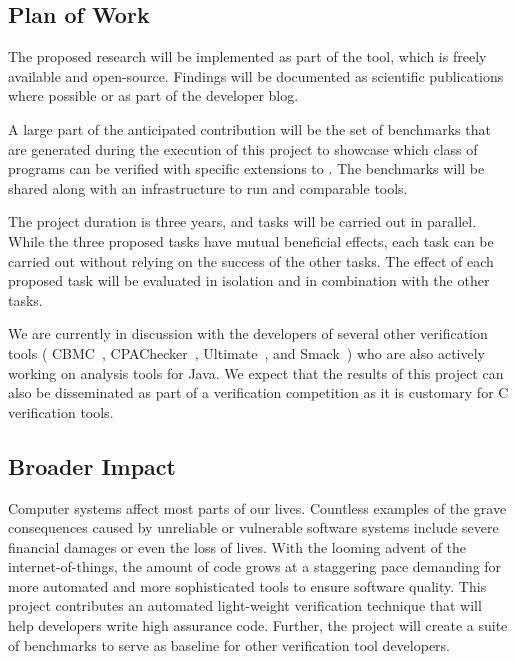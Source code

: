 \subsection{Plan of Work} %
\label{sec-impl}
The proposed research will be implemented as part of the \jayhorn tool,
which is freely available and open-source. Findings will be documented
as scientific publications where possible or as part of the \jayhorn
developer blog. 

A large part of the anticipated contribution will be the set of
benchmarks that are generated during the execution of this project to 
showcase which class of programs can be verified with specific extensions
to \jayhorn. The benchmarks will be shared along with an infrastructure
to run \jayhorn and comparable tools.

The project duration is three years, and tasks will be carried out in parallel.
While the three proposed tasks have mutual beneficial effects, each task can
be carried out without relying on the success of the other tasks. 
The effect of each proposed task will be evaluated in isolation and in 
combination with the other tasks. 

We are currently in discussion with the developers of several other 
verification tools (
CBMC~\cite{DBLP:conf/tacas/KroeningT14}, CPAChecker~\cite{Beyer:2011:CTC:2032305.2032321}, Ultimate~\cite{heizmann2015ultimate}, and Smack~\cite{cav2014-re}) who
are also actively working on analysis tools for Java. We expect
that the results of this project can also be disseminated as part of a verification
competition as it is customary for C verification tools. 

\subsection{Broader Impact}
Computer systems affect most parts of our lives. 
Countless examples of the grave consequences 
caused by unreliable or vulnerable software systems
include  severe financial 
damages or even the loss of lives. With the looming advent of 
the internet-of-things, the amount of code  grows at a staggering pace 
demanding for more automated and more sophisticated tools to ensure
software quality.
This project contributes an automated light-weight verification technique that
will help developers write high assurance code.
Further, the project will create a suite of benchmarks to serve as 
baseline for other verification tool developers.  

